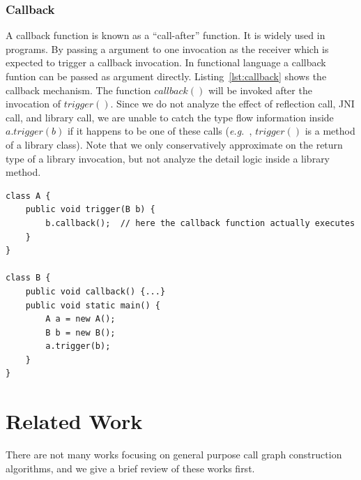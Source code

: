 \documentclass{fac}
\newcommand\eg{\textit{e.g.\ }}
\begin{document}
\subsubsection{Callback}\label{subsubsec:callback}
A callback function is known as a ``call-after'' function. It is widely used in programs. By passing a argument to one invocation as the receiver which is expected to trigger a callback invocation. In functional language a callback funtion can be passed as argument directly. Listing~\ref{lst:callback}
 shows the callback mechanism. The function $callback()$ will be invoked after the invocation of $trigger()$. Since we do not analyze the effect of reflection call, JNI call, and library call, we are unable to catch the type flow information inside $a.trigger(b)$ if it happens to be one of these calls (\eg, $trigger()$ is a method of a library class). Note that we only conservatively approximate on the return type of a library invocation, but not analyze the detail logic inside a library method.
 
\begin{minipage}{\linewidth}
\vspace{10pt}
\begin{lstlisting}[caption={Callback mechanism},label={lst:callback}]
class A {
	public void trigger(B b) {
		b.callback();  // here the callback function actually executes
	}
}

class B {
	public void callback() {...}
	public void static main() {
		A a = new A();
		B b = new B();
		a.trigger(b);
 	}
}
\end{lstlisting}
\end{minipage}

\section{Related Work}\label{sec:related-work}
There are not many works focusing on general purpose call graph construction algorithms, and we give a brief review of these works first.
\end{document}
